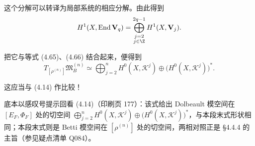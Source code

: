 这个分解可以转译为局部系统的相应分解。由此得到
\[
H^1(X,\operatorname{End}\mathbf{V}_q)=\bigoplus_{\substack{j=2\\ j\in\Z}}^{2q-1}H^1(X,\mathbf{V}_j).
\]

把它与等式 (4.65)、(4.66) 结合起来，便得到
\[
T_{[\rho^{(n)}]}\mathfrak{M}_B^{(n)}\simeq\bigoplus_{j=2}^{n}H^0(X,\mathcal{K}^j)\oplus\bigl(H^0(X,\mathcal{K}^j)\bigr)^*.
\]

这应当与 (4.14) 作比较！

\begin{annote}
底本以感叹号提示回看 (4.14)（印刷页 177）：该式给出 Dolbeault 模空间在 $[E_F,\Phi_F]$ 处的切空间 $\bigoplus_{j=2}^{n}H^0(X,\mathcal{K}^j)\oplus\bigl(H^0(X,\mathcal{K}^j)\bigr)^*$，与本段末式形状相同；本段末式则是 Betti 模空间在 $[\rho^{(n)}]$ 处的切空间，两相对照正是 §4.4.4 的主旨（参见疑点清单 Q084）。
\end{annote}
